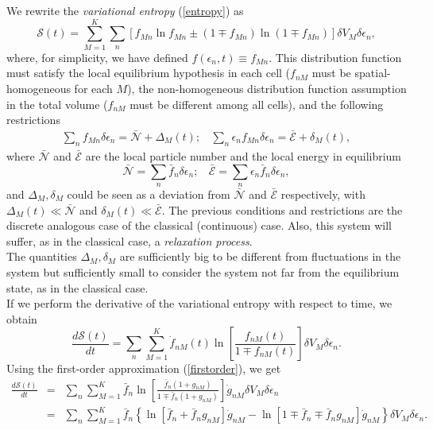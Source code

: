 \documentclass{article}
\newcommand{\de}{\delta}
\newcommand{\Ss}{\mathcal{S}}
\begin{document}
We rewrite the \textit{variational entropy} (\ref{entropy}) as
\begin{equation}
    \Ss(t)=\sum_{M=1}^{K} \sum_{n} \left[ f_{Mn} \ln f_{Mn} \pm (1 \mp f_{Mn}) \ln (1 \mp f_{Mn}) \right] \de V_M \delta \epsilon_n \label{entropy2},
\end{equation}
where, for simplicity, we have defined $f(\epsilon_{n},t)\equiv f_{Mn}$.
This distribution function must satisfy the local equilibrium hypothesis in each cell ($f_{nM}$ must be spatial-homogeneous for each $M$), the non-homogeneous distribution function assumption in the total volume ($f_{nM}$ must be different among all cells), and the following restrictions
\begin{eqnarray}
        \sum_{n}f_{Mn} \delta \epsilon_n=\bar{\mathcal{N}}+\Delta_M(t); \ \ \ \ \sum_{n}\epsilon_{n}f_{Mn} \delta \epsilon_n=\bar{\mathcal{E}}+ \delta_M(t), \label{restrictionoutside}
  \end{eqnarray}
  where $\bar {\mathcal{N}}$ and $\bar{\mathcal{E}}$ are the local particle number and the local energy in equilibrium
  \begin{equation}
      \bar{\mathcal{N}}= \sum_n \bar{f}_n \delta \epsilon_n; \ \ \ \ \bar{\mathcal{E}}= \sum_n \epsilon_n\bar{f}_n \delta \epsilon_n,
  \end{equation}
  and $\Delta_M,\delta_M$ could be seen as a deviation from $\bar{\mathcal{N}}$ and $\bar{\mathcal{E}}$ respectively, with $\Delta_M(t)\ll \bar{\mathcal{N}}$ and $\delta_M(t) \ll \bar{\mathcal{E}}$. The previous conditions and restrictions are the discrete analogous case of the classical (continuous) case. Also, this system will suffer, as in the classical case, a \textit{relaxation process}.\\
  The quantities $\Delta_M,\delta_M$ are sufficiently big to be different from fluctuations in the system but sufficiently small to consider the system not far from the equilibrium state, as in the classical case.  \\
If we perform the derivative of the variational entropy with respect to time, we obtain
\begin{equation}
   \frac{d \Ss (t)}{dt}= \sum_n \sum_{M=1}^{K} \dot{f}_{nM}(t)\ln \left[ \frac{f_{nM}(t)}{1\mp f_{nM}(t)} \right] \de V_M \delta \epsilon_n.\label{deltaH}
\end{equation}{}
Using the first-order approximation (\ref{firstorder}), we get
\begin{eqnarray}
    \frac{d\Ss (t)}{dt}&=&\sum_n \sum_{M=1}^{K} \bar{f}_{n}\ln \left[ \frac{\bar{f}_{n}(1+g_{nM})}{1\mp \bar{f}_{n} (1+ g_{nM})} \right]\dot{g}_{nM} \de V_M\delta \epsilon_n \nonumber \\
    &=&\sum_n \sum_{M=1}^{K} \bar{f}_n \left \{ \ln [\bar{f}_n+\bar{f}_n g_{nM}]\dot{g}_{nM}-\ln [1\mp\bar{f}_n\mp\bar{f}_n g_{nM}]\dot{g}_{nM}  \right \}\de V_M \delta \epsilon_n.\nonumber \\
    \label{cambioH1}
\end{eqnarray}{}
\end{document}
